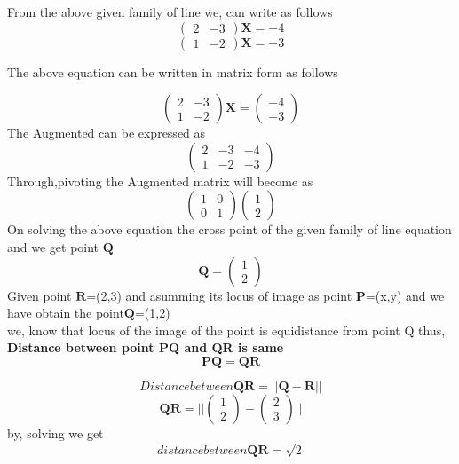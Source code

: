\documentclass[journal,12pt,twocolumn]{article}
\newcommand{\myvec}[1]{\ensuremath{\begin{pmatrix}#1\end{pmatrix}}}
\let\vec\mathbf
\begin{document}
From the above given family of line we, can write as follows
\begin{equation}
\myvec{2&-3}\vec{X}=-4\label{eq-1}
\end{equation}
\begin{equation}
\myvec{1 & -2}\vec{X}=-3\label{eq-2}
\end{equation}

The above equation can be written in matrix form as follows
 
\begin{equation}
	\myvec{
  2  & -3\\
  1 & -2}\vec{X}=
  \myvec{
  -4 \\ -3}
  \label{eq-3}
\end{equation}
The Augmented can be expressed as 
\begin{equation}
  \myvec{
 2 & -3 &-4\\ 
 1 & -2 & -3}\label{eq-4}
\end{equation} 
Through,pivoting the Augmented matrix will become as 
\\
\begin{equation}
     \myvec{
 1 & 0\\ 
 0 & 1} \myvec{1 \\ 2} \label{eq-5}
 \end{equation}
On solving the above equation the cross point of the given family of line equation and we get point $\vec{Q}$
\begin{equation}
	\vec{Q}
  = \myvec{1\\
  2}   \label{eq-6}
\end{equation}
Given point $\vec{R}$=(2,3) and asumming its locus of image as point $\vec{P}$=(x,y) and we have obtain the point$\vec{Q}$=(1,2) \\


we, know that locus of the image of the point is equidistance from point Q 
thus,
\vspace{0.5cm}
\\ 
 \textbf{
Distance between point PQ and QR is same}\\
\begin{equation}
\vec{PQ}=\vec{QR}\label{eq-7}
\end{equation}


 \begin{equation}
 Distance between \vec{QR}=||\vec{Q}-\vec{R}||
\end{equation} 
 \begin{equation}
  \vec{QR}=||\myvec{1 
\\ 2}-\myvec{2 \\ 3}||
\end{equation} 
by, solving we get
\begin{equation}
 distance between \vec{QR}=\sqrt{2}
\end{equation}
 
\end{document}

